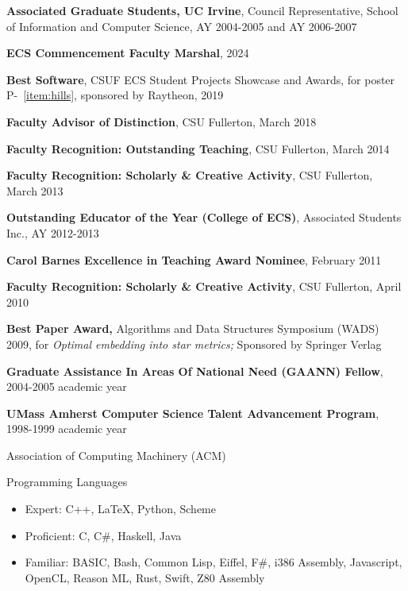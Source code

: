 \documentclass[11pt]{letter}
\begin{document}

\textbf{Associated Graduate Students, UC Irvine},  Council Representative, School of Information and Computer Science, AY 2004-2005 and AY 2006-2007 


\textbf{ECS Commencement Faculty Marshal}, 2024

\textbf{Best Software}, CSUF ECS Student Projects Showcase and Awards, for
  poster P-~\ref{item:hills}, sponsored by Raytheon, 2019

\textbf{Faculty Advisor of Distinction}, CSU Fullerton, March 2018

\textbf{Faculty Recognition: Outstanding Teaching}, CSU Fullerton, March 2014

\textbf{Faculty Recognition: Scholarly \& Creative Activity}, CSU Fullerton, March 2013

\textbf{Outstanding Educator of the Year (College of ECS)}, Associated Students Inc., AY 2012-2013

\textbf{Carol Barnes Excellence in Teaching Award Nominee}, February 2011

\textbf{Faculty Recognition: Scholarly \& Creative Activity}, CSU Fullerton, April 2010

\textbf{Best Paper Award,} Algorithms and Data Structures Symposium (WADS) 2009, for \emph{Optimal embedding into star metrics;} Sponsored by Springer Verlag

\textbf{Graduate Assistance In Areas Of National Need (GAANN) Fellow}, 2004-2005 academic year

\textbf{UMass Amherst Computer Science Talent Advancement Program}, 1998-1999 academic year


Association of Computing Machinery (ACM) \\


Programming Languages
\begin{itemize}
\item Expert: C++, LaTeX, Python, Scheme
\item Proficient: C, C\#, Haskell, Java
\item Familiar: BASIC, Bash, Common Lisp, Eiffel, F\#, i386 Assembly, Javascript,
  OpenCL, Reason ML, Rust, Swift, Z80 Assembly
\end{itemize}
\end{document}
